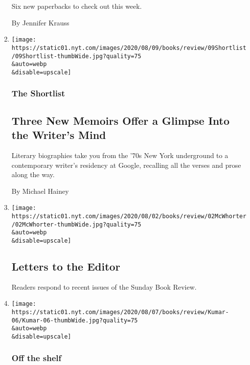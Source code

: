 \begin{enumerate}
  Six new paperbacks to check out this week.

  By Jennifer Krauss
\item
  \href{/2020/08/07/books/review/three-new-memoirs-offer-a-glimpse-into-the-writers-mind.html}{}

  \texttt{[image: https://static01.nyt.com/images/2020/08/09/books/review/09Shortlist/09Shortlist-thumbWide.jpg?quality=75\\\&auto=webp\\\&disable=upscale]}

  \hypertarget{the-shortlist}{%
  \subsubsection{The Shortlist}\label{the-shortlist}}

  \hypertarget{three-new-memoirs-offer-a-glimpse-into-the-writers-mind}{%
  \subsection{Three New Memoirs Offer a Glimpse Into the Writer's
  Mind}\label{three-new-memoirs-offer-a-glimpse-into-the-writers-mind}}

  Literary biographies take you from the '70s New York underground to a
  contemporary writer's residency at Google, recalling all the verses
  and prose along the way.

  By Michael Hainey
\item
  \href{/2020/08/07/books/review/letters-to-the-editor.html}{}

  \texttt{[image: https://static01.nyt.com/images/2020/08/02/books/review/02McWhorter/02McWhorter-thumbWide.jpg?quality=75\\\&auto=webp\\\&disable=upscale]}

  \hypertarget{letters-to-the-editor}{%
  \subsection{Letters to the Editor}\label{letters-to-the-editor}}

  Readers respond to recent issues of the Sunday Book Review.
\item
  \href{/2020/08/07/books/zadie-smith-lydia-davis-yiyun-li-mark-doty-jamaica-kincaid-colum-mccann-jenny-offill-tommy-orange.html}{}

  \texttt{[image: https://static01.nyt.com/images/2020/08/07/books/review/Kumar-06/Kumar-06-thumbWide.jpg?quality=75\\\&auto=webp\\\&disable=upscale]}

  \hypertarget{off-the-shelf}{%
  \subsubsection{Off the shelf}\label{off-the-shelf}}


\end{enumerate}
